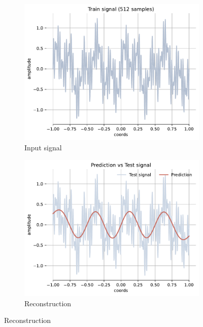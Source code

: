 \begin{figure}[h!]
    \centering
    \begin{subfigure}[b]{0.32\textwidth}
        \centering
        \includegraphics[width=\textwidth]{img/ch4/train_tones512.pdf}
        \caption{Input signal}
        \label{fig:gt-4freqs}
    \end{subfigure}
    \hfill
    \begin{subfigure}[b]{0.32\textwidth}
        \centering
        \includegraphics[width=\textwidth]{img/ch4/prediction_w10_smoothed.pdf}
        \caption{Reconstruction}
        \label{fig:rec-naive-w0}
    \end{subfigure}

\end{figure}
